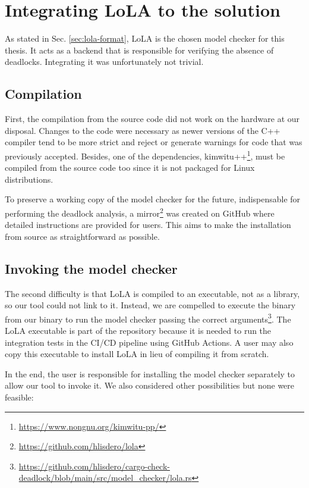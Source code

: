 \section{Integrating LoLA to the solution}

As stated in Sec. \ref{sec:lola-format},
\acrshort{LoLA} is the chosen model checker for this thesis.
It acts as a backend that is responsible for verifying the absence of deadlocks.
Integrating it was unfortunately not trivial.

\subsection{Compilation}

First, the compilation from the source code did not work on the hardware at our disposal.
Changes to the code were necessary as newer versions of the C++ compiler tend to be more strict
and reject or generate warnings for code that was previously accepted.
Besides, one of the dependencies, kimwitu++\footnote{\url{https://www.nongnu.org/kimwitu-pp/}},
must be compiled from the source code too
since it is not packaged for Linux distributions.

To preserve a working copy of the model checker for the future,
indispensable for performing the deadlock analysis,
a mirror\footnote{\url{https://github.com/hlisdero/lola}}
was created on GitHub where detailed instructions are provided for users.
This aims to make the installation from source as straightforward as possible.

\subsection{Invoking the model checker}

The second difficulty is that \acrshort{LoLA} is compiled to an executable,
not as a library, so our tool could not link to it.
Instead, we are compelled to execute the binary
from our  binary
to run the model checker passing the correct
arguments\footnote{\url{https://github.com/hlisdero/cargo-check-deadlock/blob/main/src/model_checker/lola.rs}}.
The \acrshort{LoLA} executable is part of the repository because it is needed
to run the integration tests in the CI/CD pipeline using GitHub Actions.
A user may also copy this executable to install \acrshort{LoLA}
in lieu of compiling it from scratch.

In the end, the user is responsible for installing the model checker separately
to allow our tool to invoke it.
We also considered other possibilities but none were feasible:

